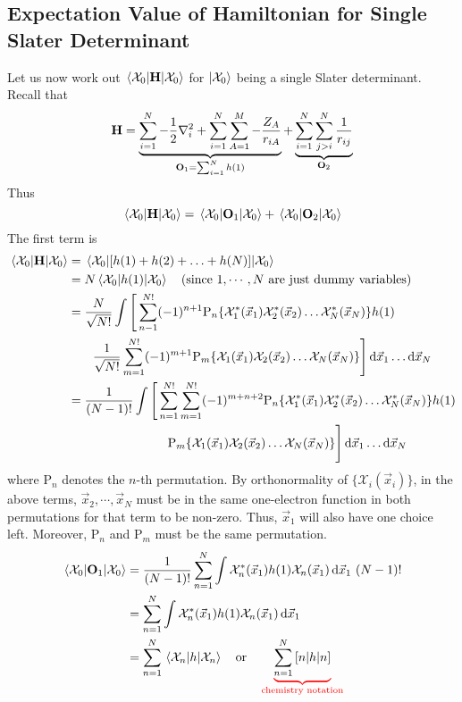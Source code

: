 \documentclass[12pt,a4paper,titlepage]{article}
\newcommand{\trm}[1]{\textrm{#1}} %
\newcommand{\Chi}{\mathcal{X}} %
\newcommand{\perm}{\trm{P}} %
\begin{document}
\subsection{Expectation Value of Hamiltonian for Single Slater Determinant}
Let us now work out $\mel{\Chi_{0}}{\vb{H}}{\Chi_{0}}$ for $\ket{\Chi_{0}}$ being a single Slater determinant. Recall that
\begin{equation}
\vb{H}=\underbrace{\sum_{i=1}^{N}-\frac{1}{2}\nabla_{i}^{2}+\sum_{i=1}^{N}\sum_{A=1}^{M}-\frac{Z_{A}}{r_{iA}}}_{\vb{O}_{1}=\sum_{i=1}^{N}h(1)}+\underbrace{\sum_{i=1}^{N}\sum_{j>i}^{N}\frac{1}{r_{ij}}}_{\vb{O}_{2}}
\end{equation}
Thus
\begin{equation}
\mel{\Chi_{0}}{\vb{H}}{\Chi_{0}}=\mel{\Chi_{0}}{\vb{O}_{1}}{\Chi_{0}}+\mel{\Chi_{0}}{\vb{O}_{2}}{\Chi_{0}}
\end{equation}
The first term is
\begin{equation}
\begin{aligned}
\mel{\Chi_{0}}{\vb{H}}{\Chi_{0}}&=\mel{\Chi_{0}}{[h(1)+h(2)+\ldots+h(N)]}{\Chi_{0}}\\
&=N\mel{\Chi_{0}}{h(1)}{\Chi_{0}}\qq{(since $1,\cdots,N$ are just dummy variables)}\\
&=\frac{N}{\sqrt{N!}}\int\Bigg[\sum_{n-1}^{N!}(-1)^{n+1}\perm_{n}\{\Chi_{1}^{*}(\vec{x}_{1})\Chi_{2}^{*}(\vec{x}_{2})\ldots\Chi_{N}^{*}(\vec{x}_{N})\}h(1)\\
&\quad\quad\frac{1}{\sqrt{N!}}\sum_{m=1}^{N!}(-1)^{m+1}\perm_{m}\{\Chi_{1}(\vec{x}_{1})\Chi_{2}(\vec{x}_{2})\ldots\Chi_{N}(\vec{x}_{N})\}\Bigg]\dd{\vec{x}_{1}}\ldots\dd{\vec{x}_{N}}\\
&=\frac{1}{(N-1)!}\int\Bigg[\sum_{n=1}^{N!}\sum_{m=1}^{N!}(-1)^{m+n+2}\perm_{n}\{\Chi_{1}^{*}(\vec{x}_{1})\Chi_{2}^{*}(\vec{x}_{2})\ldots\Chi_{N}^{*}(\vec{x}_{N})\}h(1)\\
&\qquad\qquad\qquad\qquad\perm_{m}\{\Chi_{1}(\vec{x}_{1})\Chi_{2}(\vec{x}_{2})\ldots\Chi_{N}(\vec{x}_{N})\}\Bigg]\dd{\vec{x}_{1}}\ldots\dd{\vec{x}_{N}}
\end{aligned}
\end{equation}
where $\perm_{n}$ denotes the $n$-th permutation. By orthonormality of $\{\Chi_{i}(\vec{x}_{i})\}$, in the above terms, $\vec{x}_{2},\cdots,\vec{x}_{N}$ must be in the same one-electron function in both permutations for that term to be non-zero. Thus, $\vec{x}_{1}$ will also have one choice left. Moreover, $\perm_{n}$ and $\perm_{m}$ must be the same permutation.
\begin{equation}
\begin{aligned}
\mel{\Chi_{0}}{\vb{O}_{1}}{\Chi_{0}}&=\frac{1}{(N-1)!}\sum_{n=1}^{N}\int\Chi_{n}^{*}(\vec{x}_{1})h(1)\Chi_{n}(\vec{x}_{1})\dd{\vec{x}_{1}}\,(N-1)!\\
&=\sum_{n=1}^{N}\int\Chi_{n}^{*}(\vec{x}_{1})h(1)\Chi_{n}(\vec{x}_{1})\dd{\vec{x}_{1}}\\
&=\sum_{n=1}^{N}\mel{\Chi_{n}}{h}{\Chi_{n}}\qq{or}\color{red}\underbrace{\color{black}\sum_{n=1}^{N}\,[n|h|n]}_{\trm{chemistry notation}}
\end{aligned}
\end{equation}
\end{document}
